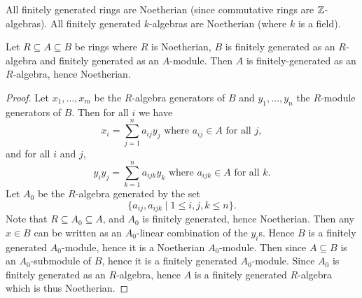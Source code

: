 \begin{cor}[3.21]
  \lv
  \begin{enum}
    \io All finitely generated rings are Noetherian (since commutative rings are $\mathbb{Z}$-algebras).
    \io All finitely generated $k$-algebras are Noetherian (where $k$ is a field).
  \end{enum}
\end{cor}

\begin{prop}
  Let $R \subseteq A \subseteq B$ be rings where $R$ is Noetherian, $B$ is finitely generated as an $R$-algebra and finitely generated as an $A$-module.
  Then $A$ is finitely-generated as an $R$-algebra, hence Noetherian.
\end{prop}

\begin{proof}
  Let $x_1,\ldots,x_m$ be the $R$-algebra generators of $B$ and $y_1,\ldots,y_n$ the $R$-module generators of $B$.
  Then for all $i$ we have
  \[ x_i = \sum_{j=1}^n a_{ij}y_j \text{ where } a_{ij} \in A \text{ for all } j, \]
  and for all $i$ and $j$,
  \[ y_iy_j = \sum_{k=1}^n a_{ijk} y_k \text{ where } a_{ijk} \in A \text{ for all } k. \]
  Let $A_0$ be the $R$-algebra generated by the set 
  \[ \{ a_{ij}, a_{ijk} \mid 1 \leq i,j,k \leq n \}. \]
  Note that $R \subseteq A_0 \subseteq A$, and $A_0$ is finitely generated, hence Noetherian.
  Then any $x \in B$ can be written as an $A_0$-linear combination of the $y_i$s.
  Hence $B$ is a finitely generated $A_0$-module, hence it is a Noetherian $A_0$-module.
  Then since $A \subseteq B$ is an $A_0$-submodule of $B$, hence it is a finitely generated $A_0$-module.
  Since $A_0$ is finitely generated as an $R$-algebra, hence $A$ is a finitely generated $R$-algebra which is thus Noetherian.
\end{proof}

